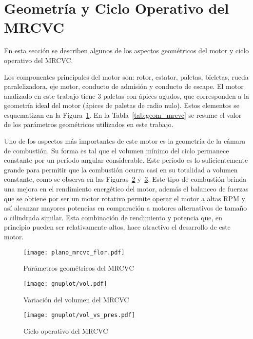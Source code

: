 \section{Geometría y Ciclo Operativo del MRCVC}
%
En esta sección se describen algunos de los aspectos geométricos del motor y
ciclo operativo del MRCVC.

Los componentes principales del motor son: rotor, estator, paletas, bieletas,
rueda paralelizadora, eje motor, conducto de admisión y conducto de escape.
%
El motor analizado en este trabajo tiene 3 paletas con ápices agudos, que
corresponden a la geometría ideal del motor (ápices de paletas de radio nulo).
%
Estos elementos se esquematizan en la Figura~\ref{fig:geom_flor_mrcvc}.
%
En la Tabla~\ref{tab:geom_mrcvc} se resume el valor de los parámetros
geométricos utilizados en este trabajo.

Uno de los aspectos más importantes de este motor es la geometría de la cámara
de combustión.
%
Su forma es tal que el volumen mínimo del ciclo permanece constante por un
período angular considerable. %
%
Este período es lo suficientemente grande para permitir que la combustión
ocurra casi en su totalidad a volumen constante, como se observa en las
Figuras~\ref{fig:mrcvc_vol_cte} y~\ref{fig:PV_mrcvc}.
%
Este tipo de combustión brinda una mejora en el rendimiento energético del
motor, además el balanceo de fuerzas que se obtiene por ser un motor rotativo
permite operar el motor a altas RPM y así alcanzar mayores potencias en
comparación a motores alternativos de tamaño o cilindrada similar.
%
Esta combinación de rendimiento y potencia que, en principio pueden ser
relativamente altos, hace atractivo el desarrollo de este motor.
%

\begin{figure}[h!]
  \centering
  \texttt{[image: plano\_mrcvc\_flor.pdf]}
  \caption{Parámetros geométricos del MRCVC~\parencite{roldan20}}\label{fig:geom_flor_mrcvc}
\end{figure}

\begin{figure}[h!]
  \centering
  \texttt{[image: gnuplot/vol.pdf]}
  \caption{Variación del volumen del MRCVC}\label{fig:mrcvc_vol_cte}
\end{figure}

\begin{figure}[h!]
  \centering
  \texttt{[image: gnuplot/vol\_vs\_pres.pdf]}
  \caption{Ciclo operativo del MRCVC}\label{fig:PV_mrcvc}
\end{figure}

